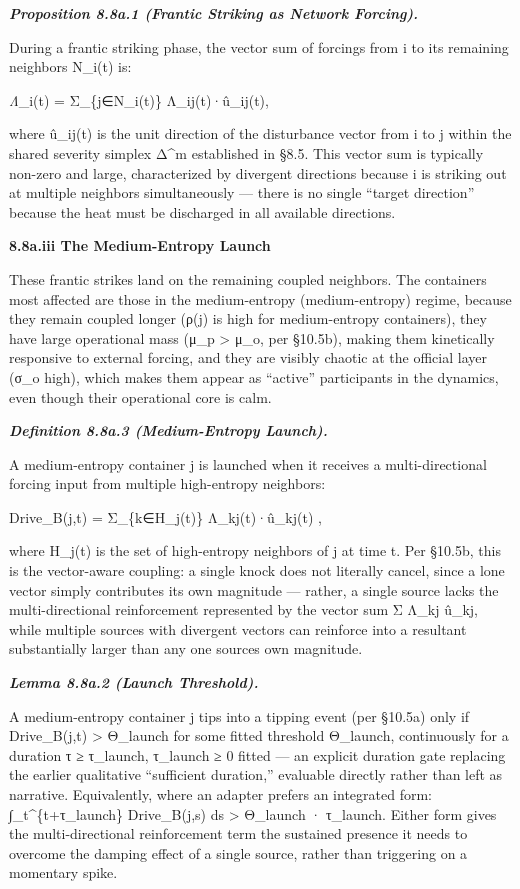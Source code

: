 \documentclass[
]{article}
\begin{document}
\emph{\textbf{Proposition 8.8a.1 (Frantic Striking as Network
Forcing).}}

During a frantic striking phase, the vector sum of forcings from i to
its remaining neighbors N\_i(t) is:

\emph{Λ⃗}\_i(t) = Σ\_\{j∈N\_i(t)\} Λ\_ij(t)·û\_ij(t),

where û\_ij(t) is the unit direction of the disturbance vector from i to
j within the shared severity simplex Δ\^{}m established in §8.5. This
vector sum is typically non-zero and large, characterized by divergent
directions because i is striking out at multiple neighbors
simultaneously --- there is no single ``target direction'' because the
heat must be discharged in all available directions.

\textbf{8.8a.iii The Medium-Entropy Launch}

These frantic strikes land on the remaining coupled neighbors. The
containers most affected are those in the medium-entropy
(medium-entropy) regime, because they remain coupled longer (ρ(j) is
high for medium-entropy containers), they have large operational mass
(μ\_p \textgreater{} μ\_o, per §10.5b), making them kinetically
responsive to external forcing, and they are visibly chaotic at the
official layer (σ\_o high), which makes them appear as ``active''
participants in the dynamics, even though their operational core is
calm.

\emph{\textbf{Definition 8.8a.3 (Medium-Entropy Launch).}}

A medium-entropy container j is launched when it receives a
multi-directional forcing input from multiple high-entropy neighbors:

Drive\_B(j,t) = Σ\_\{k∈H\_j(t)\} Λ\_kj(t)·û\_kj(t) ,

where H\_j(t) is the set of high-entropy neighbors of j at time t. Per
§10.5b, this is the vector-aware coupling: a single knock does not
literally cancel, since a lone vector simply contributes its own
magnitude --- rather, a single source lacks the multi-directional
reinforcement represented by the vector sum Σ Λ\_kj û\_kj, while
multiple sources with divergent vectors can reinforce into a resultant
substantially larger than any one sources own magnitude.

\emph{\textbf{Lemma 8.8a.2 (Launch Threshold).}}

A medium-entropy container j tips into a tipping event (per §10.5a) only
if Drive\_B(j,t) \textgreater{} Θ\_launch for some fitted threshold
Θ\_launch, continuously for a duration τ ≥ τ\_launch, τ\_launch ≥ 0
fitted --- an explicit duration gate replacing the earlier qualitative
``sufficient duration,'' evaluable directly rather than left as
narrative. Equivalently, where an adapter prefers an integrated form:
∫\_t\^{}\{t+τ\_launch\} Drive\_B(j,s) ds \textgreater{} Θ\_launch ·
τ\_launch. Either form gives the multi-directional reinforcement term
the sustained presence it needs to overcome the damping effect of a
single source, rather than triggering on a momentary spike.
\end{document}
